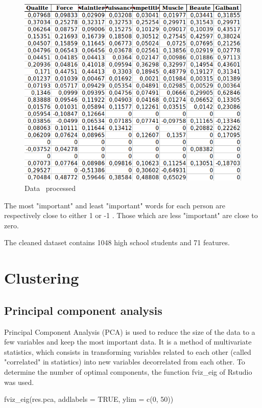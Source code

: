 \documentclass[12pt]{article}
\begin{document}
\begin{figure}[h]
\begin{center}
\includegraphics[scale=0.7]{donnée_nettoyé.png} 
\caption[]{Data \ processed }
\end{center}
\end{figure}

The most "important" and least "important" words for each person are respectively close to either 1 or -1 . Those which are less "important" are close to zero.

The cleaned dataset contains 1048
high school students and 71 features.


\section{Clustering} 


\subsection{Principal component analysis}

Principal Component Analysis (PCA) is used to reduce the size of the data to a few variables and keep the most important data. It is a method of multivariate statistics, which consists in transforming variables related to each other (called "correlated" in statistics) into new variables decorrelated from each other. To determine the number of optimal components, the function fviz\_eig of Rstudio was used. 


\begin{customFrame}
fviz_eig(res.pca, addlabels = TRUE, ylim = c(0, 50))
\end{customFrame}
 
\end{document}
